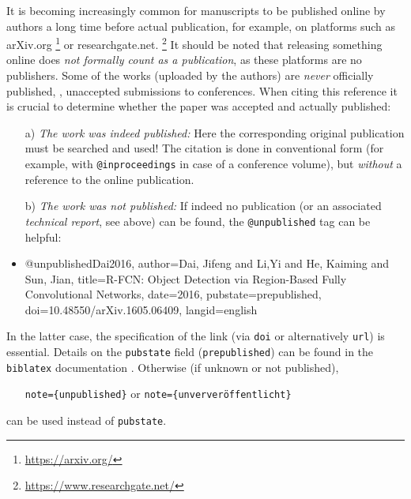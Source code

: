 It is becoming increasingly common for manuscripts to be published online by
authors a long time before actual publication, for example, on platforms such as
\textsf{arXiv.org}%
\footnote{\url{https://arxiv.org/}}
or \textsf{researchgate.net}.%
\footnote{\url{https://www.researchgate.net/}}
It should be noted that releasing something online does \emph{not formally
count as a publication}, as these platforms are no publishers. Some of the
works (uploaded by the authors) are \emph{never} officially published, \eg,
unaccepted submissions to conferences. When citing this reference it is crucial
to determine whether the paper was accepted and actually published:
%
\begin{itemize}
\item[a)]
\emph{The work was indeed published:} Here the corresponding original
publication must be searched and used! The citation is done in conventional form
(for example, with \texttt{@inproceedings} in case of a conference volume), but
\emph{without} a reference to the online publication.
\item[b)]
\emph{The work was \emph{not} published:} If indeed no publication (or an
associated \emph{technical report}, see above) can be found, the
\texttt{@unpublished} tag can be helpful:
\item %
\begin{GenericCode}[numbers=none]
@unpublished{Dai2016,
  author={Dai, Jifeng and Li,Yi and He, Kaiming and Sun, Jian},
  title={{R-FCN:} Object Detection via Region-Based Fully Convolutional Networks},
  date={2016},
  pubstate={prepublished},
  doi={10.48550/arXiv.1605.06409},
  langid={english}
}
\end{GenericCode}
\begin{itemize}
\item[\cite{Dai2016}] 
\end{itemize}
%
\end{itemize}
%
In the latter case, the specification of the link (via \texttt{doi} or alternatively
\texttt{url}) is essential. Details on the \texttt{pubstate} field
(\texttt{prepublished}) can be found in the \texttt{biblatex} documentation
\cite[Sec.\ 4.9.2.11]{Kime2024}. Otherwise (if unknown or not published),
%
\begin{itemize}
\item[]\texttt{note=\{unpublished\}} \quad or
   \quad \texttt{note=\{unververöffentlicht\}}
\end{itemize}
%
can be used instead of \texttt{pubstate}.


